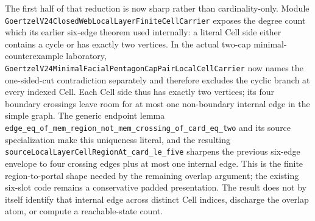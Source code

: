 \documentclass[11pt]{article}
\theoremstyle{definition}
\begin{document}
The first half of that reduction is now sharp rather than cardinality-only.
Module
\texttt{GoertzelV24ClosedWebLocalLayerFiniteCellCarrier} exposes the degree
count which its earlier six-edge theorem used internally: a literal Cell side
either contains a cycle or has exactly two vertices.  In the actual two-cap
minimal-counterexample laboratory,
\texttt{GoertzelV24MinimalFacialPentagonCapPairLocalCellCarrier} now names the
one-sided-cut contradiction separately and therefore excludes the cyclic
branch at every indexed Cell.  Each Cell side thus has exactly two vertices;
its four boundary crossings leave room for at most one non-boundary internal
edge in the simple graph.  The generic endpoint lemma
\texttt{edge\_eq\_of\_mem\_region\_not\_mem\_crossing\_of\_card\_eq\_two}
and its source specialization make this uniqueness literal, and the resulting
\texttt{sourceLocalLayerCellRegionAt\_card\_le\_five} sharpens the previous
six-edge envelope to four crossing edges plus at most one internal edge.  This
is the finite region-to-portal shape needed by the remaining overlap argument;
the existing six-slot code remains a conservative padded presentation.  The
result does not by itself identify that internal edge across distinct Cell
indices, discharge the overlap atom, or compute a reachable-state count.
\end{document}
